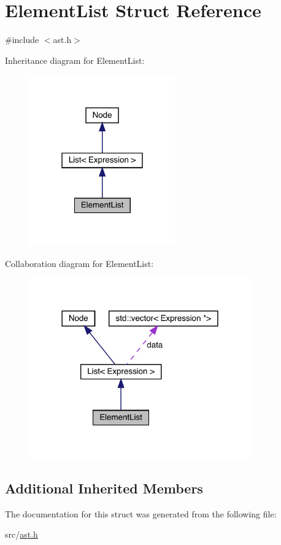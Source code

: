 \hypertarget{struct_element_list}{}\section{Element\+List Struct Reference}
\label{struct_element_list}


{\ttfamily \#include $<$ast.\+h$>$}



Inheritance diagram for Element\+List\+:\nopagebreak
\begin{figure}[H]
\begin{center}
\leavevmode
\includegraphics[width=178pt]{struct_element_list__inherit__graph}
\end{center}
\end{figure}


Collaboration diagram for Element\+List\+:\nopagebreak
\begin{figure}[H]
\begin{center}
\leavevmode
\includegraphics[width=270pt]{struct_element_list__coll__graph}
\end{center}
\end{figure}
\subsection*{Additional Inherited Members}


The documentation for this struct was generated from the following file\+:\begin{DoxyCompactItemize}
\item 
src/\hyperlink{ast_8h}{ast.\+h}\end{DoxyCompactItemize}

